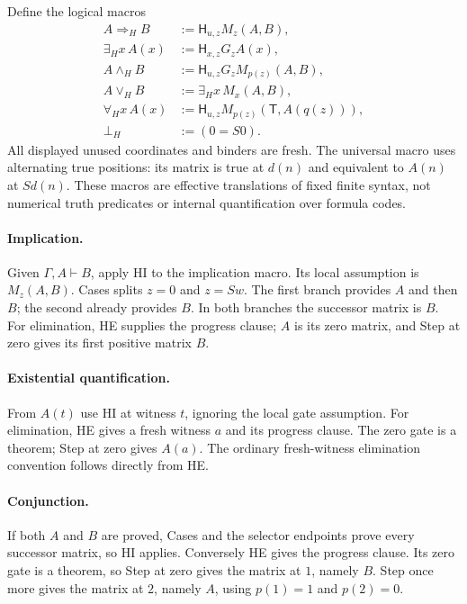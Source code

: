 \documentclass[11pt,letterpaper]{article}
\theoremstyle{definition}\newtheorem{definition}[theorem]{Definition}
\theoremstyle{remark}\newtheorem{remark}[theorem]{Remark}
\begin{document}
Define the logical macros
\[
\begin{aligned}
 A\Rightarrow_H B
   &:=\mathsf H_{u,z}M_z(A,B),\\
 \exists_H x\,A(x)
   &:=\mathsf H_{x,z}G_zA(x),\\
 A\wedge_H B
   &:=\mathsf H_{u,z}G_zM_{p(z)}(A,B),\\
 A\vee_H B
   &:=\exists_H x\,M_x(A,B),\\
 \forall_H x\,A(x)
   &:=\mathsf H_{u,z}M_{p(z)}(\mathsf T,A(q(z))),\\
 \bot_H&:=(0=S0).
\end{aligned}
 \tag{H-macros}
\]
All displayed unused coordinates and binders are fresh.  The universal
macro uses alternating true positions: its matrix is true at $d(n)$
and equivalent to $A(n)$ at $Sd(n)$.
These macros are effective translations of fixed finite syntax, not
numerical truth predicates or internal quantification over formula codes.

\paragraph{Implication.}
Given $\Gamma,A\vdash B$, apply HI to the implication macro.
Its local assumption is $M_z(A,B)$.  Cases splits $z=0$ and
$z=Sw$.  The first branch provides $A$ and then $B$; the second
already provides $B$.  In both branches the successor matrix is $B$.
For elimination, HE supplies the progress clause; $A$ is its zero
matrix, and Step at zero gives its first positive matrix $B$.

\paragraph{Existential quantification.}
From $A(t)$ use HI at witness $t$, ignoring the local gate assumption.
For elimination, HE gives a fresh witness $a$ and its progress clause.
The zero gate is a theorem; Step at zero gives $A(a)$.  The ordinary
fresh-witness elimination convention follows directly from HE.

\paragraph{Conjunction.}
If both $A$ and $B$ are proved, Cases and the selector endpoints prove
every successor matrix, so HI applies.  Conversely HE gives the
progress clause.  Its zero gate is a theorem, so Step at zero gives
the matrix at $1$, namely $B$.  Step once more gives the matrix at $2$,
namely $A$, using $p(1)=1$ and $p(2)=0$.
\end{document}
